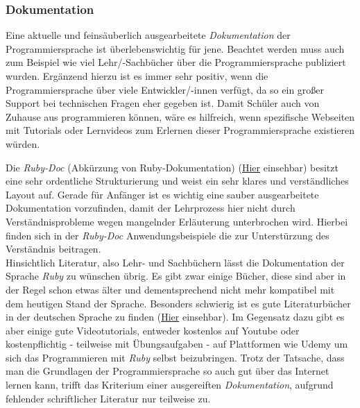 \documentclass[12pt,DIV=14, version=first, BCOR=10mm,a4paper,twoside,parskip=half-,headsepline,headinclude]{scrartcl}
\begin{document}
\subsubsection{Dokumentation}
\begin{flushleft}
Eine aktuelle und feinsäuberlich ausgearbeitete \textit{Dokumentation} der Programmiersprache ist überlebenswichtig für jene. Beachtet werden muss auch zum Beispiel wie viel Lehr/-Sachbücher über die Programmiersprache publiziert wurden. Ergänzend hierzu ist es immer sehr positiv, wenn die Programmiersprache über viele Entwickler/-innen verfügt, da so ein großer Support bei technischen Fragen eher gegeben ist. Damit Schüler auch von Zuhause aus programmieren können, wäre es hilfreich, wenn spezifische Webseiten mit Tutorials oder Lernvideos zum Erlernen dieser Programmiersprache existieren würden.

Die \textit{\glqq Ruby-Doc\grqq} (Abkürzung von \glqq Ruby-Dokumentation\grqq) (\href {https://ruby-doc.org/}{Hier} einsehbar) besitzt eine sehr ordentliche Strukturierung und weist ein sehr klares und verständliches Layout auf. Gerade für Anfänger ist es wichtig eine sauber ausgearbeitete Dokumentation vorzufinden, damit der Lehrprozess hier nicht durch Verständnisprobleme wegen mangelnder Erläuterung unterbrochen wird. Hierbei finden sich in der \textit{\glqq Ruby-Doc\grqq} Anwendungsbeispiele die zur Unterstürzung des Verständnis beitragen. \\
Hinsichtlich Literatur, also Lehr- und Sachbüchern lässt die Dokumentation der Sprache \textit{\glqq Ruby\grqq} zu wünschen übrig. Es gibt zwar einige Bücher, diese sind aber in der Regel schon etwas älter und dementsprechend nicht mehr kompatibel mit dem heutigen Stand der Sprache. Besonders schwierig ist es gute Literaturbücher in der deutschen Sprache zu finden (\href {https://wiki.ruby-portal.de/Literatur.html} {Hier} einsehbar). Im Gegensatz dazu gibt es aber einige gute Videotutorials, entweder kostenlos auf Youtube oder kostenpflichtig - teilweise mit Übungsaufgaben - auf Plattformen wie {\glqq Udemy\grqq} um sich das Programmieren mit \textit{\glqq Ruby\grqq} selbst beizubringen.
Trotz der Tatsache, dass man die Grundlagen der Programmiersprache so auch gut über das Internet lernen kann, trifft das Kriterium einer ausgereiften \textit{Dokumentation}, aufgrund fehlender schriftlicher Literatur nur teilweise zu.
\end{flushleft}
\end{document}
